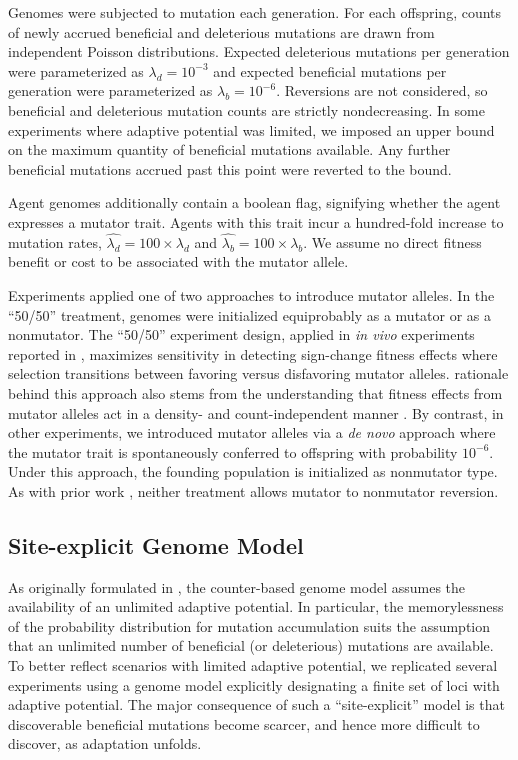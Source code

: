 Genomes were subjected to mutation each generation.
For each offspring, counts of newly accrued beneficial and deleterious mutations are drawn from independent Poisson distributions.
Expected deleterious mutations per generation were parameterized as
$\lambda_d=10^{-3}$ and expected beneficial mutations per generation were parameterized as $\lambda_b=10^{-6}$.
Reversions are not considered, so beneficial and deleterious mutation counts are strictly nondecreasing.
In some experiments where adaptive potential was limited, we imposed an upper bound on the maximum quantity of beneficial mutations available.
Any further beneficial mutations accrued past this point were reverted to the bound.

Agent genomes additionally contain a boolean flag, signifying whether the agent expresses a mutator trait.
Agents with this trait incur a hundred-fold increase to mutation rates, $\hat{\lambda_d} = 100 \times \lambda_d$ and $\hat{\lambda_b} = 100 \times \lambda_b$.
We assume no direct fitness benefit or cost to be associated with the mutator allele.

Experiments applied one of two approaches to introduce mutator alleles.
In the ``50/50'' treatment, genomes were initialized equiprobably as a mutator or as a nonmutator.
The ``50/50'' experiment design, applied in \textit{in vivo} experiments reported in \citet{raynes2018sign}, maximizes sensitivity in detecting sign-change fitness effects where selection transitions between favoring versus disfavoring mutator alleles.
rationale behind this approach also stems from the understanding that fitness effects from mutator alleles act in a density- and count-independent manner \citep{raynes2019selection}.
By contrast, in other experiments, we introduced mutator alleles via a \textit{de novo} approach where the mutator trait is spontaneously conferred to offspring with probability $10^{-6}$.
Under this approach, the founding population is initialized as nonmutator type.
As with prior work \citep{raynes2018sign}, neither treatment allows mutator to nonmutator reversion.

\subsection{Site-explicit Genome Model} \label{sec:site-explicit}
As originally formulated in \citet{raynes2018sign}, the counter-based genome model assumes the availability of an unlimited adaptive potential.
In particular, the memorylessness of the probability distribution for mutation accumulation suits the assumption that an unlimited number of beneficial (or deleterious) mutations are available.
To better reflect scenarios with limited adaptive potential, we replicated several experiments using a genome model explicitly designating a finite set of loci with adaptive potential.
The major consequence of such a ``site-explicit'' model is that discoverable beneficial mutations become scarcer, and hence more difficult to discover, as adaptation unfolds.

